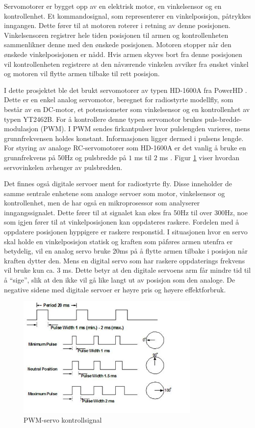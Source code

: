 Servomotorer er bygget opp av en elektrisk motor, en vinkelsensor og en kontrollenhet. Et kommandosignal, som representerer en vinkelposisjon, påtrykkes inngangen. Dette fører til at motoren roterer i retning av denne posisjonen. Vinkelsensoren registrer hele tiden posisjonen til armen og kontrollenheten sammenlikner denne med den ønskede posisjonen. Motoren stopper når den ønskede vinkelposisjonen er nådd. Hvis armen skyves bort fra denne posisjonen vil kontrollenheten registrere at den nåværende vinkelen avviker fra ønsket vinkel og motoren vil flytte armen tilbake til rett posisjon. 

I dette prosjektet ble det brukt servomotorer av typen HD-1600A fra PowerHD \cite{PowerHD}. Dette er en enkel analog servomotor, beregnet for radiostyrte modellfly, som består av en DC-motor, et potensiometer som vinkelsensor og en kontrollenhet av typen YT2462B. For å kontrollere denne typen servomotor brukes puls-bredde-modulasjon (PWM). I PWM sendes firkantpulser hvor pulslengden varieres, mens grunnfrekvensen holdes konstant. Informasjonen ligger dermed i pulsens lengde. For styring av analoge RC-servomotorer som HD-1600A er det vanlig å bruke en grunnfrekvens på 50Hz og pulsbredde på $1$ ms til $2$ ms \cite{PCBheaven}. Figur \ref{fig:PWM} viser hvordan servovinkelen avhenger av pulsbredden.

Det finnes også digitale servoer ment for radiostyrte fly. Disse inneholder de samme sentrale enhetene som analoge servoer som motor, vinkelsensor og kontrollenhet, men de har også en mikroprosessor som analyserer inngangssignalet. Dette fører til at signalet kan økes fra 50Hz til over 300Hz, noe som igjen fører til at vinkelposisjonen kan oppdateres raskere. Fordelen med å oppdatere posisjonen hyppigere er raskere responstid. I situasjonen hvor en servo skal holde en vinkelposisjon statisk og kraften som påføres armen utenfra er betydelig, vil en analog servo bruke 20ms på å flytte armen tilbake i posisjon når kraften dytter den. Mens en digital servo som har raskere oppdaterings frekvens vil bruke kun ca. $3$ ms. Dette betyr at den digitale servoens arm får mindre tid til å ``sige'', slik at den ikke vil gå like langt ut av posisjon som den analoge. De negative sidene med digitale servoer er høyre pris og høyere effektforbruk.    

\begin{figure}[H]
\centering
\includegraphics[width=0.8\textwidth]{img/pwm_servo.jpg}
\caption{PWM-servo kontrollsignal \cite{PWM}}
\label{fig:PWM}
\end{figure}   


